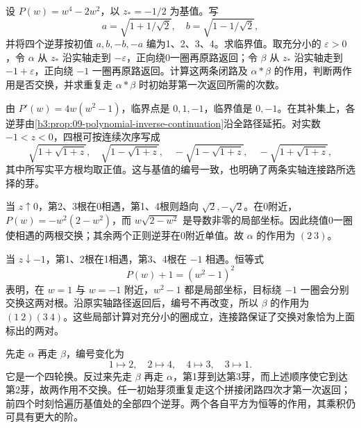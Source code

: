 \begin{exercise}\label{b3:ex:09-5}
设 \(P(w)=w^4-2w^2\)，以 \(z_*=-1/2\) 为基值。写
\[
 a=\sqrt{1+1/\sqrt2},\quad b=\sqrt{1-1/\sqrt2},
\]
并将四个逆芽按初值 \(a,b,-b,-a\) 编为1、2、3、4。求临界值。取充分小的 \(\varepsilon>0\)，令 \(\alpha\) 从 \(z_*\) 沿实轴走到 \(-\varepsilon\)，正向绕0一圈再原路返回；令 \(\beta\) 从 \(z_*\) 沿实轴走到 \(-1+\varepsilon\)，正向绕 \(-1\) 一圈再原路返回。计算这两条闭路及 \(\alpha*\beta\) 的作用，判断两作用是否交换，并求重复走 \(\alpha*\beta\) 时初始芽第一次返回所需的次数。
\end{exercise}
\begin{solution}
由 \(P'(w)=4w(w^2-1)\)，临界点是 \(0,1,-1\)，临界值是 \(0,-1\)。在其补集上，各逆芽由\cref{b3:prop:09-polynomial-inverse-continuation}沿全路径延拓。对实数 \(-1<z<0\)，四根可按连续次序写成
\[
 \sqrt{1+\sqrt{1+z}},\quad
 \sqrt{1-\sqrt{1+z}},\quad
 -\sqrt{1-\sqrt{1+z}},\quad
 -\sqrt{1+\sqrt{1+z}},
\]
其中所写实平方根均取正值。这与基值的编号一致，也明确了两条实轴连接路所选择的芽。

当 \(z\uparrow0\)，第2、3根在0相遇，第1、4根则趋向 \(\sqrt2,-\sqrt2\)。在0附近，\(P(w)=-w^2(2-w^2)\)，而 \(w\sqrt{2-w^2}\) 是导数非零的局部坐标。因此绕值0一圈使相遇的两根交换；其余两个正则逆芽在0附近单值。故 \(\alpha\) 的作用为 \((2\ 3)\)。

当 \(z\downarrow-1\)，第1、2根在1相遇，第3、4根在 \(-1\) 相遇。恒等式
\[
 P(w)+1=(w^2-1)^2
\]
表明，在 \(w=1\) 与 \(w=-1\) 附近，\(w^2-1\) 都是局部坐标，目标绕 \(-1\) 一圈会分别交换这两对根。沿原实轴路径返回后，编号不再改变，所以 \(\beta\) 的作用为 \((1\ 2)(3\ 4)\)。这些局部计算对充分小的圈成立，连接路保证了交换对象恰为上面标出的两对。

先走 \(\alpha\) 再走 \(\beta\)，编号变化为
\[
 1\longmapsto2,\quad
 2\longmapsto4,\quad
 4\longmapsto3,\quad
 3\longmapsto1.
\]
它是一个四轮换。反过来先走 \(\beta\) 再走 \(\alpha\)，第1芽到达第3芽，而上述顺序使它到达第2芽，故两作用不交换。任一初始芽须重复走这个拼接闭路四次才第一次返回；前四个时刻恰遍历基值处的全部四个逆芽。两个各自平方为恒等的作用，其乘积仍可具有更大的阶。
\end{solution}


